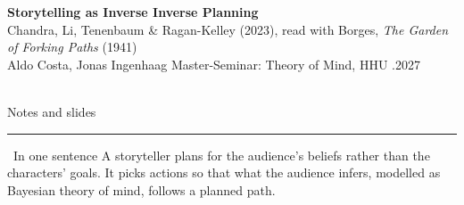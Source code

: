 \documentclass[10pt,a4paper]{article}
\newcommand{\belief}[1]{\textcolor{beliefPurple}{#1}}
\begin{document}
\begin{tcolorbox}[enhanced, sharp corners, boxrule=0pt, frame hidden,
  colback=mDarkTeal, coltext=white, left=8pt, right=8pt, top=6pt, bottom=6pt, after skip=1pt]
\begin{minipage}[c]{0.82\linewidth}
{\LARGE\bfseries Storytelling as Inverse Inverse Planning}\\[0.25em]
{\small Chandra, Li, Tenenbaum \& Ragan-Kelley (2023), read with Borges, \emph{The Garden of Forking Paths} (1941)}\\[0.25em]
{\footnotesize Aldo Costa, Jonas Ingenhaag \quad\textbullet\quad Master-Seminar: Theory of Mind, HHU \quad\textbullet{}.2027}
\end{minipage}\hfill
\begin{minipage}[c]{0.15\linewidth}
\centering
{\setlength{\fboxsep}{0.12cm}\colorbox{white}{}}\\[0.1em]
{\tiny Notes and slides}
\end{minipage}
\end{tcolorbox}
{\color{mLightBrown}\rule{\linewidth}{1.2pt}}

\vspace{0.4em}
\begin{malert}{\faLightbulb\ In one sentence}
A storyteller plans for the \belief{audience's beliefs} rather than the characters' goals. It picks actions so that what the audience infers, modelled as Bayesian theory of mind, follows a planned path.
\end{malert}
\end{document}
